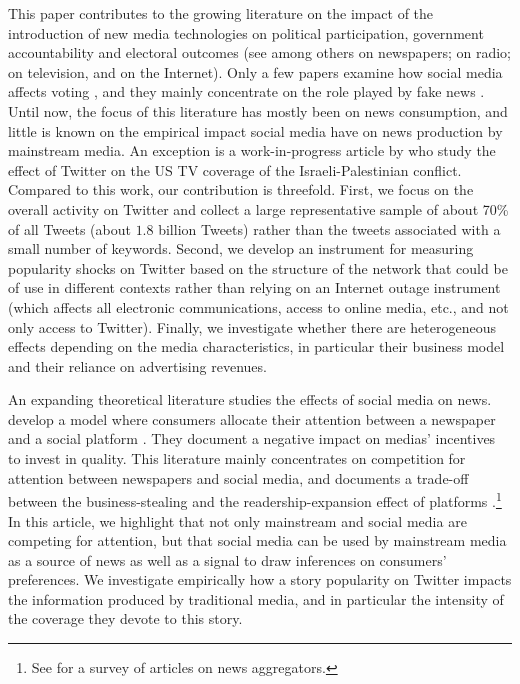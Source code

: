 This paper contributes to the growing literature on the impact of the introduction of new media technologies on political participation, government accountability and electoral outcomes (see among others \citet{Gentzkowetal2011,SnyderStromberg2010} on newspapers; \citet{Stromberg2004} on radio; \citet{Gentzkow2006,AngelucciCage2019,AngelucciCageSinkinson2020} on television, and \citet{BoxellGentzkowShapiro2018,Gavazzaetal2019} on the Internet). Only a few papers examine how social media affects voting \citep[for a review of the literature see][]{Zhuravskayaetal2020}, and they mainly concentrate on the role played by fake news \citep{AllcottGentzkow2017}. Until now, the focus of this literature has mostly been on news consumption, and little is known on the empirical impact social media have on news production by mainstream media. An exception is a work-in-progress article by \citet{HatteMadinierZhuravskaya2020}  who study the effect of Twitter on the US  TV coverage of the Israeli-Palestinian conflict. Compared to this work, our contribution is threefold. First, we focus on the overall activity on Twitter and collect a large representative sample of about 70\% of all Tweets (about $1.8$ billion Tweets) rather than the tweets associated with a small number of keywords. Second, we develop an instrument for measuring popularity shocks on Twitter based on the structure of the network that could be of use in different contexts rather than relying on an Internet outage instrument (which affects all electronic communications, access to online media, etc., and not only access to Twitter). Finally, we investigate whether there are heterogeneous effects depending on the media characteristics, in particular their business model and their reliance on advertising revenues.

An expanding theoretical literature studies the effects of social media on news.  develop a model where consumers allocate their attention between a newspaper and a social platform \citep[see also][for a theory of news coverage in environments of information abundance]{AlaouiGermano2020}. They document a negative impact on medias' incentives to invest in quality. This literature mainly concentrates on competition for attention between newspapers and social media, and documents a trade-off between the business-stealing and the readership-expansion effect of platforms \citep{JeonNasr2016}.\footnote{See \citet{Jeon2018} for a survey of articles on news aggregators.}  In this article, we highlight that not only mainstream and social media are competing for attention, but that social media can be used by mainstream media as a source of news as well as a signal to draw inferences on consumers' preferences. We investigate empirically how a story popularity on Twitter impacts the information produced by traditional media, and in particular the intensity of the coverage they devote to this story.

